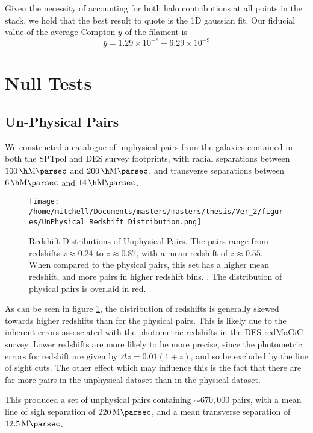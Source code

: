 Given the necessity of accounting for both halo contributions at all points in the stack, we hold that the best result to quote is the 1D gaussian fit. Our fiducial value of the average Compton-$y$ of the filament is 
\begin{equation}
\boxed{\bar y = 1.29 \times 10^{-8} \pm 6.29 \times 10^{-9}}
\end{equation}
\section{Null Tests}
\subsection{Un-Physical Pairs}
We constructed a catalogue of unphysical pairs from the galaxies contained in both the SPTpol and DES survey footprints, with radial separations between $\SI{100}{\per\h\mega\parsec}$ and $\SI{200}{\per\h\mega\parsec}$, and transverse separations between $\SI{6}{\per\h\mega\parsec}$ and $\SI{14}{\per\h\mega\parsec}$. 

\begin{figure}[H]
\centering
\texttt{[image: /home/mitchell/Documents/masters/masters/thesis/Ver\_2/figures/UnPhysical\_Redshift\_Distribution.png]}
\caption{Redshift Distributions of Unphysical Pairs. The pairs range from redshifts $z\approx0.24$ to $z\approx0.87$, with a mean redshift of $z\approx0.55$. When compared to the physical pairs, this set has a higher mean redshift, and more pairs in higher redshift bins.   . The distribution of physical pairs is overlaid in red.}
\label{fig:unphysical:redshifts}
\end{figure}
As can be seen in figure \ref{fig:unphysical:redshifts}, the distribution of redshifts is generally skewed towards higher redshifts than for the physical pairs. This is likely due to the inherent errors assosciated with the photometric redshifts in the DES redMaGiC survey. Lower redshifts are more likely to be more precise, since the photometric errors for redshift are given by $\Delta z= 0.01(1+z)$, and so be excluded by the line of sight cuts. The other effect which may influence this is the fact that there are far more pairs in the unphysical dataset than in the physical dataset. 


This produced a set of unphysical pairs containing $\sim 670,000$ pairs, with a mean line of sigh separation of $\SI{220}{\mega\parsec}$, and a mean transverse separation of $\SI{12.5}{\mega\parsec}$.


